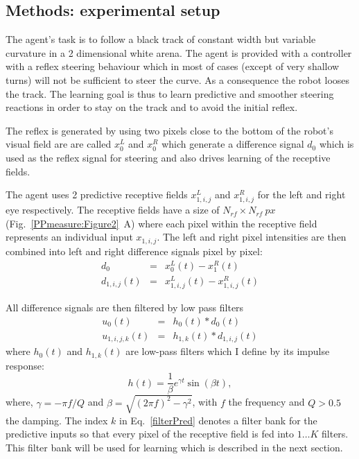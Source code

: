 \subsection{Methods: experimental setup \label{Chapter8:RobotStructure}}

The agent's task is to follow a black track of constant width but
variable curvature in a 2 dimensional white arena.  The agent is
provided with a controller with a reflex steering behaviour which in
most of cases (except of very shallow turns) will not be sufficient to
steer the curve.  As a consequence the robot looses the track.
The learning goal is thus to learn predictive and smoother steering
reactions in order to stay on the track and to avoid the initial
reflex.

The reflex is generated by using two pixels close to the bottom of
the robot's visual field are are called $x_0^L$ and $x_0^R$ which
generate a difference signal $d_0$ which is used as the reflex
signal for steering and also drives learning of the receptive
fields.

The agent uses 2 predictive receptive fields $x_{1,i,j}^{L}$ and
$x_{1,i,j}^{R}$ for the left and right eye respectively. The receptive
fields have a size of $N_{rf} \times N_{rf}~px$ (Fig.~\ref{PPmeasure:Figure2}~A)
where each pixel within the receptive field represents an individual
input $x_{1,i,j}$. The left and right pixel intensities are then
combined into left and right difference signals pixel by pixel:
\begin{eqnarray}
d_0 & = & x_0^L(t) - x_1^R(t) \label{diffX0} \\
d_{1,i,j}(t) & = & x_{1,i,j}^{L}(t) - x_{1,i,j}^{R}(t) \label{diffX1}
\end{eqnarray}

All difference signals are then filtered by low pass filters
\begin{eqnarray}
u_0(t) & = & h_0(t) * d_0(t) \label{filterReflex} \\
u_{1,i,j,k}(t) & = & h_{1,k}(t) * d_{1,i,j}(t) \label{filterPred}
\end{eqnarray}
where $h_0(t)$ and $h_{1,k}(t)$ are 
low-pass filters which I define by its impulse
response:
\begin{equation}
	h(t)=\frac{1}{\beta}e^{\gamma t}\sin(\beta t),
\end{equation}
where, $\gamma=-\pi f/Q$ and $\beta={\sqrt{(2 \pi f)^2 - \gamma^2}}$,
with $f$ the frequency and $Q>0.5$ the damping. The index
$k$ in Eq.~\ref{filterPred} denotes a filter bank for the predictive
inputs so that every pixel of the receptive field is fed into $1\ldots K$
filters. This filter bank will be used for learning which is described
in the next section.

